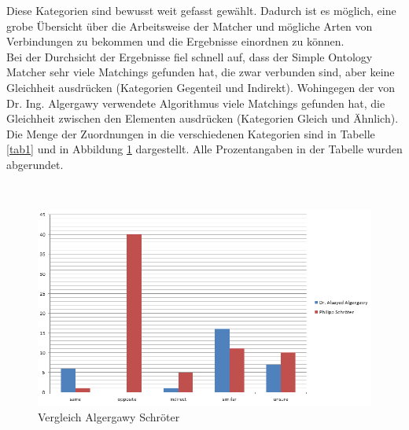 		Diese Kategorien sind bewusst weit gefasst gewählt. Dadurch ist es
		möglich, eine grobe Übersicht über die Arbeitsweise der Matcher und mögliche
		Arten von Verbindungen zu bekommen und die Ergebnisse einordnen zu können.\\
		Bei der Durchsicht der Ergebnisse fiel schnell auf, dass der Simple Ontology
		Matcher sehr viele Matchings gefunden hat, die zwar verbunden sind, aber keine
		Gleichheit ausdrücken (Kategorien Gegenteil und Indirekt).
		Wohingegen der von Dr. Ing. Algergawy verwendete Algorithmus viele Matchings
		gefunden hat, die Gleichheit zwischen den Elementen ausdrücken (Kategorien
		Gleich und Ähnlich). Die Menge der Zuordnungen in die verschiedenen
		Kategorien sind in Tabelle \ref{tab1} und in Abbildung
		\ref{fig16} dargestellt. Alle Prozentangaben in der Tabelle wurden
		abgerundet.\\
		
		\begin{center}
		\begin{table}[h!]
		\small
		\setlength\tabcolsep{2pt}
		\noindent{}
		\caption{Kategorisierte Ergebnisse}
		\label{tab1}
		\end{table}
		\end{center}
		\\
				
		\begin{figure}[h!]
		\centering
		\includegraphics[width=1.0\textwidth]{pics/Vergleich-Algergawy-Schroeter_2016-11-22.png}
		\caption{Vergleich Algergawy Schröter}
		\label{fig16}
		\end{figure}
		
